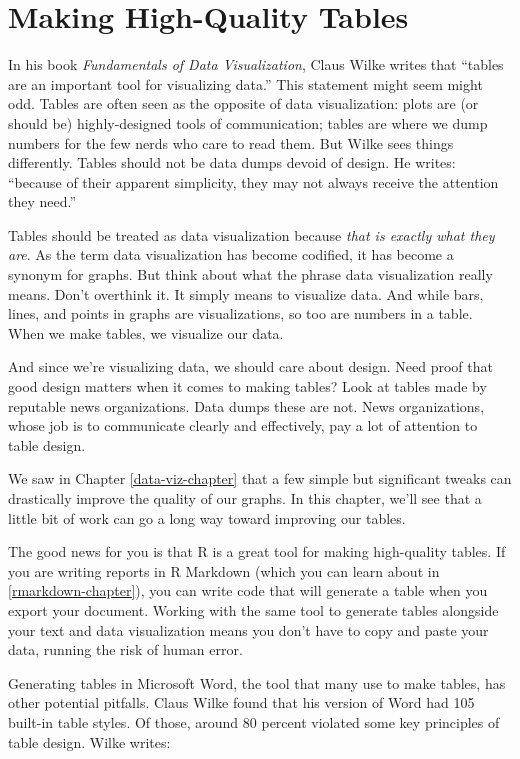 \documentclass[
]{book}
\begin{document}
\hypertarget{tables-chapter}{%
\chapter{Making High-Quality Tables}\label{tables-chapter}}

In his book \emph{Fundamentals of Data Visualization}, Claus Wilke writes that ``tables are an important tool for visualizing data.'' This statement might seem might odd. Tables are often seen as the opposite of data visualization: plots are (or should be) highly-designed tools of communication; tables are where we dump numbers for the few nerds who care to read them. But Wilke sees things differently. Tables should not be data dumps devoid of design. He writes: ``because of their apparent simplicity, they may not always receive the attention they need.''

Tables should be treated as data visualization because \emph{that is exactly what they are}. As the term data visualization has become codified, it has become a synonym for graphs. But think about what the phrase data visualization really means. Don't overthink it. It simply means to visualize data. And while bars, lines, and points in graphs are visualizations, so too are numbers in a table. When we make tables, we visualize our data.

And since we're visualizing data, we should care about design. Need proof that good design matters when it comes to making tables? Look at tables made by reputable news organizations. Data dumps these are not. News organizations, whose job is to communicate clearly and effectively, pay a lot of attention to table design.

We saw in Chapter \ref{data-viz-chapter} that a few simple but significant tweaks can drastically improve the quality of our graphs. In this chapter, we'll see that a little bit of work can go a long way toward improving our tables.

The good news for you is that R is a great tool for making high-quality tables. If you are writing reports in R Markdown (which you can learn about in \ref{rmarkdown-chapter}), you can write code that will generate a table when you export your document. Working with the same tool to generate tables alongside your text and data visualization means you don't have to copy and paste your data, running the risk of human error.

Generating tables in Microsoft Word, the tool that many use to make tables, has other potential pitfalls. Claus Wilke found that his version of Word had 105 built-in table styles. Of those, around 80 percent violated some key principles of table design. Wilke writes:
\end{document}
